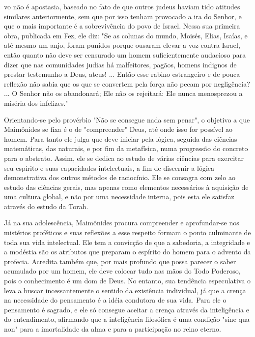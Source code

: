 \begin{itemize}
vo não é apostasia, baseado no fato de que outros judeus haviam tido
atitudes similares anteriormente, sem que por isso tenham provocado a
ira do Senhor, e que o mais importante é a sobrevivência do povo de
Israel. Nessa sua primei­ra obra, publicada em Fez, ele diz: "Se as
colunas do mundo, Moisés, Elias, Isaías, e até mesmo um anjo, foram
punidos porque ousaram elevar a voz contra Is­rael, então quanto não
deve ser censurado um homem suficientemente auda­cioso para dizer que
nas comunidades judias há malfeitores, pagãos, homens indignos de
prestar testemunho a Deus, ateus! ... Então esse rabino estrangeiro e de
pouca reflexão não sabia que os que se convertem pela força não pecam
por negligência? ... O Senhor não os abandonará; Ele não os rejeitará:
Ele nun­ca menosprezou a miséria dos infelizes."

Orientando-se pelo provérbio "Não se consegue nada sem penar", o
objetivo a que Maimônides se fixa é o de "compreender" Deus, até onde
isso for possível ao homem. Para tanto ele julga que deve iniciar pela
lógica, segui­da das ciências matemáticas, das naturais, e por fim da
metafísica, numa pro­gressão do concreto para o abstrato. Assim, ele se
dedica ao estudo de várias ciências para exercitar seu espírito e suas
capacidades intelectuais, a fim de dis­cernir a lógica demonstrativa dos
outros métodos de raciocínio. Ele se consa­gra com zelo ao estudo das
ciências gerais, mas apenas como elementos neces­sários à aquisição de
uma cultura global, e não por uma necessidade interna, pois esta ele
satisfaz através do estudo da Torah.

Já na sua adolescência, Maimônides procura compreender e aprofun­dar-se
nos mistérios proféticos e suas reflexões a esse respeito formam o ponto
culminante de toda sua vida intelectual. Ele tem a convicção de que a
sabedo­ria, a integridade e a modéstia são os atributos que preparam o
espírito do ho­mem para o advento da profecia. Acredita também que, por
mais profundo que possa parecer o saber acumulado por um homem, ele deve
colocar tudo nas mãos do Todo Poderoso, pois o conhecimento é um dom de
Deus. No entan­to, sua tendência especulativa o leva a buscar
incessantemente o sentido da exis­tência individual, já que a crença na
necessidade do pensamento é a idéia con­dutora de sua vida. Para ele o
pensamento é sagrado, e ele só consegue aceitar a crença através da
inteligência e do entendimento, afirmando que a inteligên­cia filosófica
é uma condição "sine qua non" para a imortalidade da alma e pa­ra a
participação no reino eterno.



\end{itemize}
